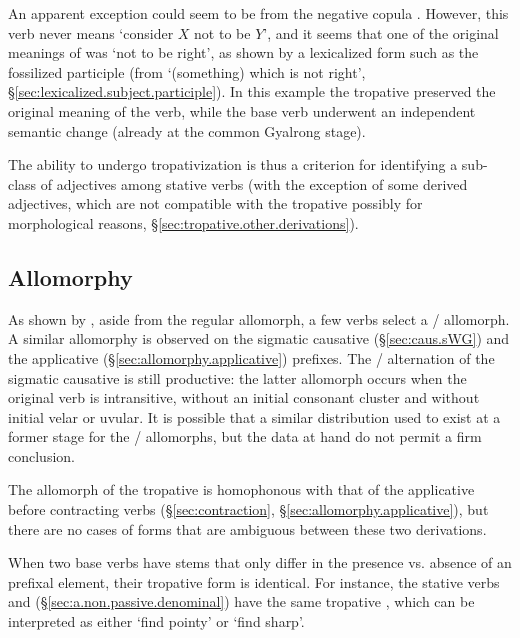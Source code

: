 An apparent exception could seem to be  from the negative copula . However, this verb never means `consider $X$ not to be $Y$', and it seems that one of the original meanings of   was `not to be right', as shown by a lexicalized form such as the fossilized participle  (from `(something) which is not right', §\ref{sec:lexicalized.subject.participle}). In this example the tropative preserved the original meaning of the verb, while the base verb underwent an independent semantic change (already at the common Gyalrong stage).

The ability to undergo tropativization is thus a criterion for identifying a sub-class of adjectives among stative verbs (with the exception of some derived adjectives, which are not compatible with the tropative possibly for morphological reasons, §\ref{sec:tropative.other.derivations}).

\subsection{Allomorphy} \label{sec:tropative.allomorphy}
As shown by , aside from the regular  allomorph, a few verbs select a  /  allomorph. A similar allomorphy is observed on the sigmatic causative (§\ref{sec:caus.sWG}) and the applicative (§\ref{sec:allomorphy.applicative}) prefixes. The  /  alternation of the sigmatic causative is still productive: the latter allomorph occurs when the original verb is intransitive, without an initial consonant cluster and without initial velar or uvular. It is possible that a similar distribution used to exist at a former stage for the  /  allomorphs, but the data at hand do not permit a firm conclusion.

The  allomorph of the tropative is homophonous with that of the applicative before  contracting verbs (§\ref{sec:contraction}, §\ref{sec:allomorphy.applicative}), but there are no cases of forms that are ambiguous between these two derivations.

When two base verbs have stems that only differ in the presence vs. absence of an  prefixal element, their tropative form is identical. For instance, the stative verbs  and  (§\ref{sec:a.non.passive.denominal}) have the same tropative , which can be interpreted as either `find pointy' or `find sharp'.

